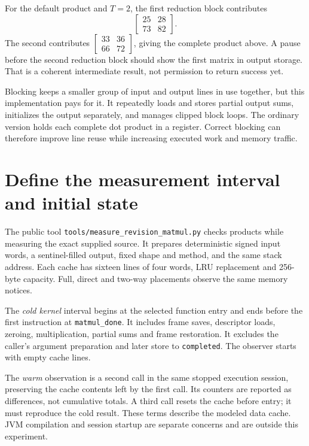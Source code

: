 For the default product and $T=2$, the first reduction block contributes
\[
  \begin{bmatrix}25&28\\73&82\end{bmatrix}.
\]
The second contributes $\begin{bmatrix}33&36\\66&72\end{bmatrix}$, giving the
complete product above. A pause before the second reduction block should show
the first matrix in output storage. That is a coherent intermediate result, not
permission to return success yet.



Blocking keeps a smaller group of input and output lines in use together, but
this implementation pays for it. It repeatedly loads and stores partial output
sums, initializes the output separately, and manages clipped block loops. The
ordinary version holds each complete dot product in a register. Correct blocking
can therefore improve line reuse while increasing executed work and memory traffic.

\section{Define the measurement interval and initial state}

The public tool \texttt{tools/measure\_revision\_matmul.py} checks products while
measuring the exact supplied source. It prepares deterministic signed input words,
a sentinel-filled output, fixed shape and method, and the same stack address.
Each cache has sixteen lines of four words, LRU replacement and 256-byte capacity.
Full, direct and two-way placements observe the same memory notices.

The \emph{cold kernel} interval begins at the selected function entry and ends
before the first instruction at \texttt{matmul\_done}. It includes frame saves,
descriptor loads, zeroing, multiplication, partial sums and frame restoration.
It excludes the caller's argument preparation and later store to
\texttt{completed}. The observer starts with empty cache lines.

The \emph{warm} observation is a second call in the same stopped execution
session, preserving the cache contents left by the first call. Its counters are
reported as differences, not cumulative totals. A third call resets the cache
before entry; it must reproduce the cold result. These terms describe the modeled
data cache. JVM compilation and session startup are separate concerns and are
outside this experiment.

